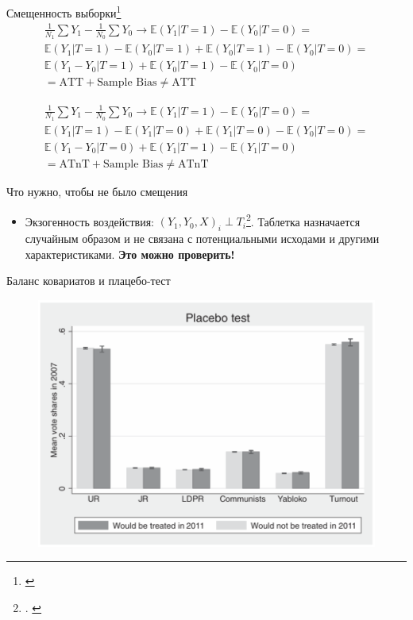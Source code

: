 \begin{frame}{Смещенность выборки\footnote{\cite[Раздел 3.2.1]{angrist2008mostly}}}
\begin{gather*}
\frac{1}{N_1}\sum Y_1 - \frac{1}{N_0}\sum Y_0 \longrightarrow \mathbb{E}(Y_1|T = 1) -  \mathbb{E}(Y_0|T = 0) = \\ \mathbb{E}(Y_1|T = 1) - \mathbb{E}(Y_0|T = 1) + \mathbb{E}(Y_0|T = 1) - \mathbb{E}(Y_0|T = 0) = \\ \mathbb{E}(Y_1-Y_0|T = 1) + \mathbb{E}(Y_0|T = 1) - \mathbb{E}(Y_0|T = 0) \\
 {= \text{ATT} + \text{Sample Bias} \neq \text{ATT}}
\end{gather*}


\begin{gather*}
\frac{1}{N_1}\sum Y_1 - \frac{1}{N_0}\sum Y_0 \longrightarrow \mathbb{E}(Y_1|T = 1) -  \mathbb{E}(Y_0|T = 0) = \\ \mathbb{E}(Y_1|T = 1) - \mathbb{E}(Y_1|T = 0) + \mathbb{E}(Y_1|T = 0) - \mathbb{E}(Y_0|T = 0) = \\ \mathbb{E}(Y_1-Y_0|T = 0) + \mathbb{E}(Y_1|T = 1) - \mathbb{E}(Y_1|T = 0) \\{= \text{ATnT} + \text{Sample Bias} \neq \text{ATnT}}
\end{gather*}

\end{frame}

\begin{frame}{Что нужно, чтобы не было смещения}

\begin{itemize}
    \item Экзогенность воздействия: $(Y_1, Y_0, X)_i \perp T_i$\footnote{\cite[Раздел 2]{angrist2008mostly}. \cite[Глава 3]{imbens2015causal}}. Таблетка назначается случайным образом и не связана с потенциальными исходами и другими характеристиками. \textbf{Это можно проверить!} 
\end{itemize}

\end{frame}




\begin{frame}{Баланс ковариатов и плацебо-тест}
\begin{figure}
    \centering
    \includegraphics[width=\textwidth]{Images/placebo_test.png}
    \label{fig:my_label}
    
\end{figure}
\end{frame}


